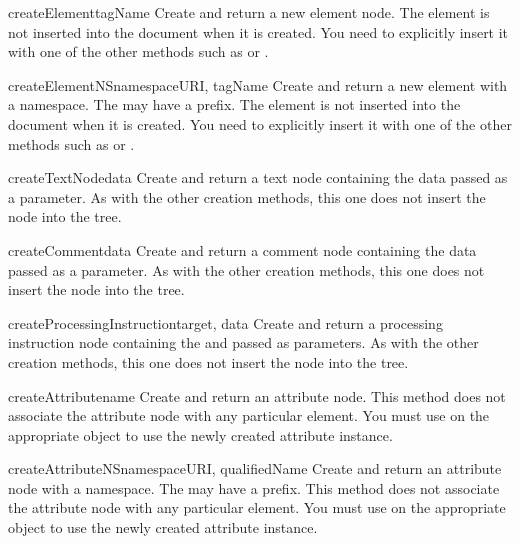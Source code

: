 \begin{methoddesc}[Document]{createElement}{tagName}
Create and return a new element node.  The element is not inserted
into the document when it is created.  You need to explicitly insert
it with one of the other methods such as  or
.
\end{methoddesc}

\begin{methoddesc}[Document]{createElementNS}{namespaceURI, tagName}
Create and return a new element with a namespace.  The
 may have a prefix.  The element is not inserted into the
document when it is created.  You need to explicitly insert it with
one of the other methods such as  or
.
\end{methoddesc}

\begin{methoddesc}[Document]{createTextNode}{data}
Create and return a text node containing the data passed as a
parameter.  As with the other creation methods, this one does not
insert the node into the tree.
\end{methoddesc}

\begin{methoddesc}[Document]{createComment}{data}
Create and return a comment node containing the data passed as a
parameter.  As with the other creation methods, this one does not
insert the node into the tree.
\end{methoddesc}

\begin{methoddesc}[Document]{createProcessingInstruction}{target, data}
Create and return a processing instruction node containing the
 and  passed as parameters.  As with the other
creation methods, this one does not insert the node into the tree.
\end{methoddesc}

\begin{methoddesc}[Document]{createAttribute}{name}
Create and return an attribute node.  This method does not associate
the attribute node with any particular element.  You must use
 on the appropriate  object
to use the newly created attribute instance.
\end{methoddesc}

\begin{methoddesc}[Document]{createAttributeNS}{namespaceURI, qualifiedName}
Create and return an attribute node with a namespace.  The
 may have a prefix.  This method does not associate the
attribute node with any particular element.  You must use
 on the appropriate  object
to use the newly created attribute instance.
\end{methoddesc}

